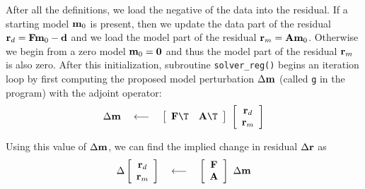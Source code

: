 \par
After all the definitions,
we load the negative of the data into the residual.
If a starting model $\bold m_0$ is present,
then we update the data part of the residual
$\bold r_d=\bold F \bold m_0 - \bold d$
and we load
the model part of the residual
$ \bold r_m = \bold A \bold m_0$.
Otherwise we begin from a zero model $\bold m_0=\bold 0$ and thus
the model part of the residual $ \bold r_m$ is also zero.
After this initialization, subroutine 
\texttt{solver\_reg()} %
begins an iteration loop by first computing
the proposed model perturbation $\Delta \bold m$
(called \texttt{g} in the program)
with the adjoint operator:
\begin{equation}
 \Delta \bold m
 \quad\longleftarrow\quad
 \left[
 \begin{array}{cc}
   \bold F\T &   \bold A\T
 \end{array}
 \right]
 \
 \left[
 \begin{array}{c}
   \bold r_d \\
   \bold r_m
 \end{array}
 \right]
\end{equation}
\begin{comment}
I chose to implement the model roughening operator $\bold A$
with the convolution subroutine \texttt{tcai1()} \vpageref{lst:tcai1},
which has transient end effects
(and an output length equal to the input length plus the filter length).
The adjoint of subroutine {\tt tcai1()} suggests perturbations
in the convolution input (not the filter).
\end{comment}
Using this value of $\Delta \bold m$,
we can
find the implied change in residual $\Delta \bold r$ as
\begin{equation}
        \Delta
        \left[
        \begin{array}{c}
        \bold r_d \\
        \bold r_m
        \end{array}
        \right]
\quad\longleftarrow\quad
        \left[
        \begin{array}{c}
        \bold F \\
        \bold A
        \end{array}
        \right]
        \
        \Delta \bold m
\end{equation}
